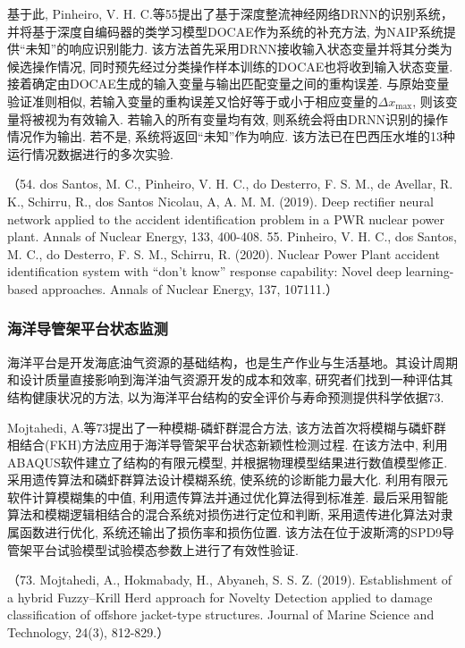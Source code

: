 \documentclass{Style/aas}
\begin{document}
\begin{multicols}{2}
  基于此, Pinheiro, V. H. C.等55提出了基于深度整流神经网络DRNN的识别系统，并将基于深度自编码器的类学习模型DOCAE作为系统的补充方法, 为NAIP系统提供“未知”的响应识别能力. 该方法首先采用DRNN接收输入状态变量并将其分类为候选操作情况, 同时预先经过分类操作样本训练的DOCAE也将收到输入状态变量. 接着确定由DOCAE生成的输入变量与输出匹配变量之间的重构误差. 与原始变量验证准则相似, 若输入变量的重构误差又恰好等于或小于相应变量的$ \varDelta x_{\max} $, 则该变量将被视为有效输入. 若输入的所有变量均有效, 则系统会将由DRNN识别的操作情况作为输出. 若不是, 系统将返回“未知”作为响应. 该方法已在巴西压水堆的13种运行情况数据进行的多次实验.

  （54.	dos Santos, M. C., Pinheiro, V. H. C., do Desterro, F. S. M., de Avellar, R. K., Schirru, R., dos Santos Nicolau, A, A. M. M. (2019). Deep rectifier neural network applied to the accident identification problem in a PWR nuclear power plant. Annals of Nuclear Energy, 133, 400-408.
  55.	Pinheiro, V. H. C., dos Santos, M. C., do Desterro, F. S. M., Schirru, R. (2020). Nuclear Power Plant accident identification system with “don’t know” response capability: Novel deep learning-based approaches. Annals of Nuclear Energy, 137, 107111.）


  \subsubsection{海洋导管架平台状态监测}
  海洋平台是开发海底油气资源的基础结构，也是生产作业与生活基地。其设计周期和设计质量直接影响到海洋油气资源开发的成本和效率, 研究者们找到一种评估其结构健康状况的方法, 以为海洋平台结构的安全评价与寿命预测提供科学依据73.

  Mojtahedi, A.等73提出了一种模糊-磷虾群混合方法, 该方法首次将模糊与磷虾群相结合(FKH)方法应用于海洋导管架平台状态新颖性检测过程. 在该方法中, 利用ABAQUS软件建立了结构的有限元模型, 并根据物理模型结果进行数值模型修正.采用遗传算法和磷虾群算法设计模糊系统, 使系统的诊断能力最大化. 利用有限元软件计算模糊集的中值, 利用遗传算法并通过优化算法得到标准差. 最后采用智能算法和模糊逻辑相结合的混合系统对损伤进行定位和判断, 采用遗传进化算法对隶属函数进行优化, 系统还输出了损伤率和损伤位置. 该方法在位于波斯湾的SPD9导管架平台试验模型试验模态参数上进行了有效性验证.

  （73.	Mojtahedi, A., Hokmabady, H., Abyaneh, S. S. Z. (2019). Establishment of a hybrid Fuzzy–Krill Herd approach for Novelty Detection applied to damage classification of offshore jacket-type structures. Journal of Marine Science and Technology, 24(3), 812-829.）


\end{multicols}
\end{document}
